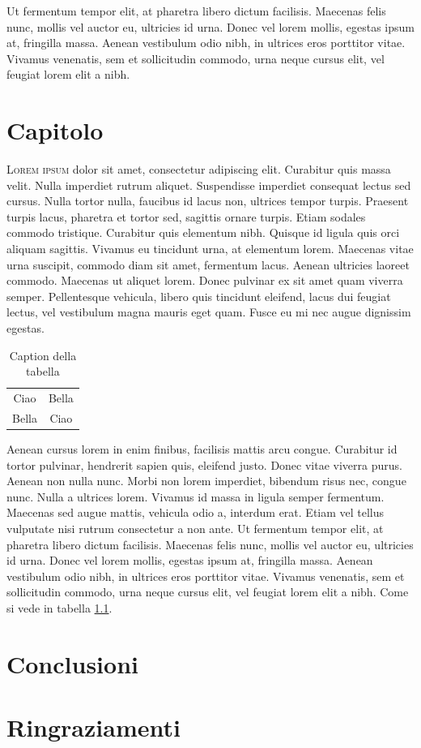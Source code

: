 \documentclass[a4paper, 11pt, oneside]{book}
\begin{document}
Ut fermentum tempor elit, at pharetra libero dictum facilisis. Maecenas felis nunc, mollis vel auctor eu, ultricies id urna. Donec vel lorem mollis, egestas ipsum at, fringilla massa. Aenean vestibulum odio nibh, in ultrices eros porttitor vitae. Vivamus venenatis, sem et sollicitudin commodo, urna neque cursus elit, vel feugiat lorem elit a nibh. 





\chapter{Capitolo}\label{ch:2}

\lettrine[lines=2, depth=0, lraise=-0.1, findent=0.3em, nindent=0.3em]{\color{BrickRed}\fontsize{50pt}{72pt}L}{orem ipsum} dolor sit amet, consectetur adipiscing elit. Curabitur quis massa velit. Nulla imperdiet rutrum aliquet. Suspendisse imperdiet consequat lectus sed cursus. Nulla tortor nulla, faucibus id lacus non, ultrices tempor turpis. Praesent turpis lacus, pharetra et tortor sed, sagittis ornare turpis. Etiam sodales commodo tristique. Curabitur quis elementum nibh. Quisque id ligula quis orci aliquam sagittis. Vivamus eu tincidunt urna, at elementum lorem. Maecenas vitae urna suscipit, commodo diam sit amet, fermentum lacus. Aenean ultricies laoreet commodo. Maecenas ut aliquet lorem. Donec pulvinar ex sit amet quam viverra semper. Pellentesque vehicula, libero quis tincidunt eleifend, lacus dui feugiat lectus, vel vestibulum magna mauris eget quam. Fusce eu mi nec augue dignissim egestas.

\begin{table}[h!]
    \centering
    \begin{tabular}{c|c}
       Ciao  & Bella \\
       Bella  & Ciao
    \end{tabular}
    \caption{Caption della tabella}
    \label{tab:my_label}
\end{table}
Aenean cursus lorem in enim finibus, facilisis mattis arcu congue. Curabitur id tortor pulvinar, hendrerit sapien quis, eleifend justo. Donec vitae viverra purus. Aenean non nulla nunc. Morbi non lorem imperdiet, bibendum risus nec, congue nunc. Nulla a ultrices lorem. Vivamus id massa in ligula semper fermentum. Maecenas sed augue mattis, vehicula odio a, interdum erat. Etiam vel tellus vulputate nisi rutrum consectetur a non ante. Ut fermentum tempor elit, at pharetra libero dictum facilisis. Maecenas felis nunc, mollis vel auctor eu, ultricies id urna. Donec vel lorem mollis, egestas ipsum at, fringilla massa. Aenean vestibulum odio nibh, in ultrices eros porttitor vitae. Vivamus venenatis, sem et sollicitudin commodo, urna neque cursus elit, vel feugiat lorem elit a nibh. Come si vede in tabella \ref{tab:my_label}.

\chapter{Conclusioni}

\chapter{Ringraziamenti}



\printbibliography
\end{document}
